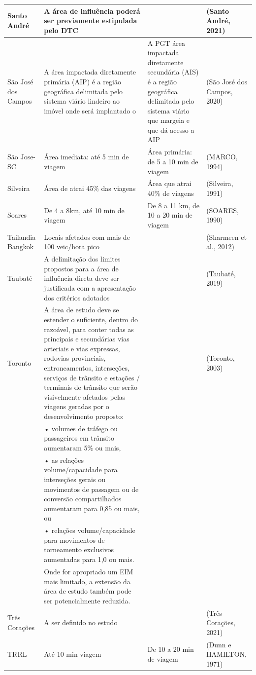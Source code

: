 \documentclass[]{article}
\begin{document}
\begin{table}
\begin{tabular}[t]{l|l|l|l}
\hline
Santo André & A área de influência poderá ser previamente estipulada pelo DTC &  & (Santo André, 2021)\\
\hline
São José dos Campos & A área impactada diretamente primária (AIP) é a região geográfica delimitada pelo sistema viário lindeiro ao imóvel onde será implantado o & A PGT área impactada diretamente secundária (AIS) é a região geográfica delimitada pelo sistema viário que margeia e que dá acesso a AIP & (São José dos Campos, 2020)\\
\hline
São Jose-SC & Área imediata: até 5 min de viagem & Área primária: de 5 a 10 min de viagem & (MARCO, 1994)\\
\hline
Silveira & Área de atrai 45\% das viagens & Área que atrai 40\% de viagens & (Silveira, 1991)\\
\hline
Soares & De 4 a 8km, até 10 min de viagem & De 8 a 11 km, de 10 a 20 min de viagem & (SOARES, 1990)\\
\hline
Tailandia  Bangkok & Locais afetados com mais de 100 veic/hora pico &  & (Sharmeen et al., 2012)\\
\hline
Taubaté & A delimitação dos limites propostos para a área de influência direta deve ser justificada com a apresentação dos critérios adotados &  & (Taubaté, 2019)\\
\hline
Toronto & A área de estudo deve se estender o suficiente, dentro do razoável, para conter todas as principais e secundárias vias arteriais e vias expressas, rodovias provinciais, entroncamentos, interseções, serviços de trânsito e estações / terminais de trânsito que serão visivelmente afetados pelas viagens geradas por o desenvolvimento proposto: &  & (Toronto, 2003)\\
\hline
 & • volumes de tráfego ou passageiros em trânsito aumentaram 5\% ou mais, &  & \\
\hline
 & • as relações volume/capacidade para interseções gerais ou movimentos de passagem ou de conversão compartilhados aumentaram para 0,85 ou mais, ou &  & \\
\hline
 & • relações volume/capacidade para movimentos de torneamento exclusivos aumentadas para 1,0 ou mais. &  & \\
\hline
 & Onde for apropriado um EIM mais limitado, a extensão da área de estudo também pode ser potencialmente reduzida. &  & \\
\hline
Três Corações & A ser definido no estudo &  & (Três Corações, 2021)\\
\hline
TRRL & Até 10 min viagem & De 10 a 20 min de viagem & (Dunn e HAMILTON, 1971)\\

\end{tabular}
\end{table}
\end{document}
